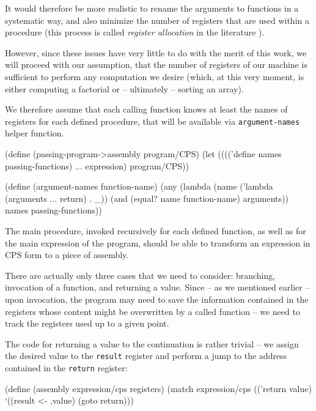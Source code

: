It would therefore be more realistic to rename the arguments to functions
in a systematic way, and also minimize the number of registers that
are used within a procedure (this process is called \textit{register
allocation} in the literature\cite{WikipediaRegisterAllocation} \cite{Keep2013}).

However, since these issues have very little to do with the merit of
this work, we will proceed with our assumption, that the number of
registers of our machine is sufficient to perform any computation
we desire (which, at this very moment, is either computing a factorial
or -- ultimately -- sorting an array).

We therefore assume that each calling function knows at least the
names of registers for each defined procedure, that will be available
via \texttt{argument\--names} helper function.

\begin{Snippet}
(define (passing-program->assembly program/CPS)
  (let (((('define names passing-functions)
	  ...
	  expression) program/CPS))

    (define (argument-names function-name)
      (any (lambda (name ('lambda (arguments ... return) . _))
             (and (equal? name function-name)
                  arguments))
           names passing-functions))
\end{Snippet}

The main procedure, invoked recursively for each defined function,
as well as for the main expression of the program, should be able
to transform an expression in CPS form to a piece of assembly.

There are actually only three cases that we need to consider:
branching, invocation of a function, and returning a value. Since
-- as we mentioned earlier -- upon invocation, the program
may need to save the information contained in the registers
whose content might be overwritten by a called function
-- we need to track the registers used up to a given point.

The code for returning a value to the continuation is rather
trivial -- we assign the desired value to the \texttt{result}
register and perform a jump to the address contained in the
\texttt{return} register:

\begin{Snippet}
    (define (assembly expression/cps registers)
      (match expression/cps
        (('return value)
         `((result <- ,value)
           (goto return)))
\end{Snippet}


